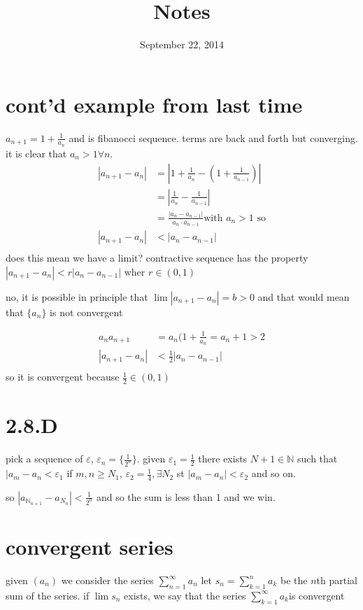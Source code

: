 \documentclass[letterpaper]{article}
\begin{document}
\title{Notes}
\date{September 22, 2014}
\maketitle
\section*{cont'd example from last time}
$a_{n+1}=1+\frac{1}{a_n}$ and is fibanocci sequence. terms are back and forth but converging. it is clear that $a_n>1\forall n$.
\begin{align*}
  \left\lvert a_{n+1}-a_n\right\rvert&=\left\lvert 1+\frac{1}{a_n}-\left(1+\frac{1}{a_{n-1}}\right)\right\rvert\\
  &=\left\lvert\frac{1}{a_n}-\frac{1}{a_{n-1}}\right\rvert\\
  &=\frac{\left\lvert a_n-a_{n-1}\right\rvert}{a_n\cdot a_{n-1}}\text{with $a_n>1$ so}\\
  \left\lvert a_{n+1}-a_n\right\rvert&<\left\lvert a_{n}-a_{n-1}\right\rvert\\
\end{align*}
does this mean we have a limit?
contractive sequence has the property
$|a_{n+1}-a_n|<r|a_n-a_{n-1}|$ wher $r\in(0,1)$

no, it is possible in principle that $\lim|a_{n+1}-a_n|=b>0$ and that would mean that $\{a_n\}$ is not convergent

\begin{align*}
  a_na_{n+1}&=a_n(1+\frac{1}{a_n}=a_n+1>2\\
  \left\lvert a_{n+1}-a_n\right\rvert&<\frac{1}{2}\left\lvert a_{n}-a_{n-1}\right\rvert\\
\end{align*}
so it is convergent because $\frac{1}{2}\in(0,1)$

\section*{2.8.D}
pick a sequence of $\varepsilon$, $\varepsilon_n=\{\frac{1}{2^n}\}$. given $\varepsilon_1=\frac{1}{2}$ there exists $N+1\in\mathbb{N}$ such that $|a_m-a_n<\varepsilon_1$ if $m,n\ge N_1$, $\varepsilon_2=\frac{1}{4}, \exists N_2$ st $\left\lvert a_m-a_n\right\rvert<\varepsilon_2$ and so on.

so $|a_{\mathbb{N}_{n+1}}-a_{N_{n}}|<\frac{1}{2^n}$ and so the sum is less than 1 and we win.
\section*{convergent series}
given $(a_n)$ we consider the series $\sum\limits_{n=1}^\infty{a_n}$ let $s_n=\sum\limits_{k=1}^n{a_k}$ be the $n$th partial sum of the series. if $\lim s_n$ exists, we say that the series $\sum\limits_{k=1}^\infty{a_k}$is convergent
\end{document}
